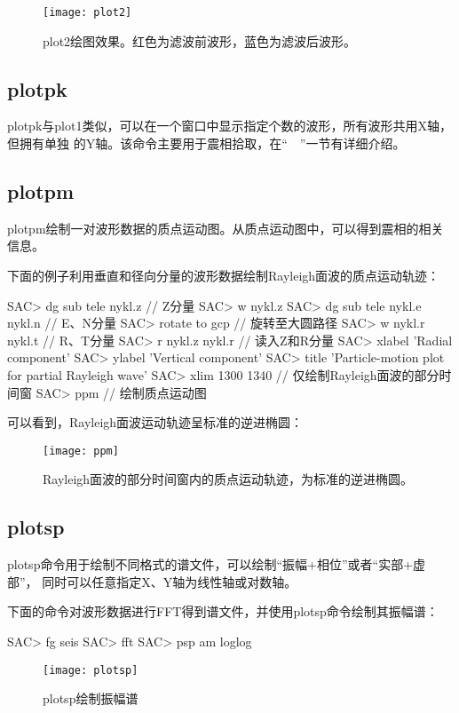 \begin{figure}[H]
\centering
\texttt{[image: plot2]}
\caption[plot2绘图效果]{plot2绘图效果。红色为滤波前波形，蓝色为滤波后波形。}
\label{fig:plot2}
\end{figure}

\subsection{plotpk}
plotpk与plot1类似，可以在一个窗口中显示指定个数的波形，所有波形共用X轴，但拥有单独
的Y轴。该命令主要用于震相拾取，在``~~''一节有详细介绍。

\subsection{plotpm}
plotpm绘制一对波形数据的质点运动图。从质点运动图中，可以得到震相的相关信息。

下面的例子利用垂直和径向分量的波形数据绘制Rayleigh面波的质点运动轨迹：
\begin{SACCode}
SAC> dg sub tele nykl.z             // Z分量        
SAC> w nykl.z           
SAC> dg sub tele nykl.e nykl.n      // E、N分量
SAC> rotate to gcp                  // 旋转至大圆路径
SAC> w nykl.r nykl.t                // R、T分量
SAC> r nykl.z nykl.r                // 读入Z和R分量
SAC> xlabel 'Radial component'
SAC> ylabel 'Vertical component'
SAC> title 'Particle-motion plot for partial Rayleigh wave'
SAC> xlim 1300 1340                 // 仅绘制Rayleigh面波的部分时间窗
SAC> ppm                            // 绘制质点运动图
\end{SACCode}

可以看到，Rayleigh面波运动轨迹呈标准的逆进椭圆：
\begin{figure}[H]
\centering
\texttt{[image: ppm]}
\caption[质点运动图。]{Rayleigh面波的部分时间窗内的质点运动轨迹，为标准的逆进椭圆。}
\label{fig:ppm}
\end{figure}

\subsection{plotsp}
plotsp命令用于绘制不同格式的谱文件，可以绘制``振幅+相位''或者``实部+虚部''，
同时可以任意指定X、Y轴为线性轴或对数轴。

下面的命令对波形数据进行FFT得到谱文件，并使用plotsp命令绘制其振幅谱：
\begin{SACCode}
SAC> fg seis
SAC> fft
SAC> psp am loglog
\end{SACCode}

\begin{figure}[H]
\centering
\texttt{[image: plotsp]}
\caption{plotsp绘制振幅谱}
\label{fig:plotsp}
\end{figure}
